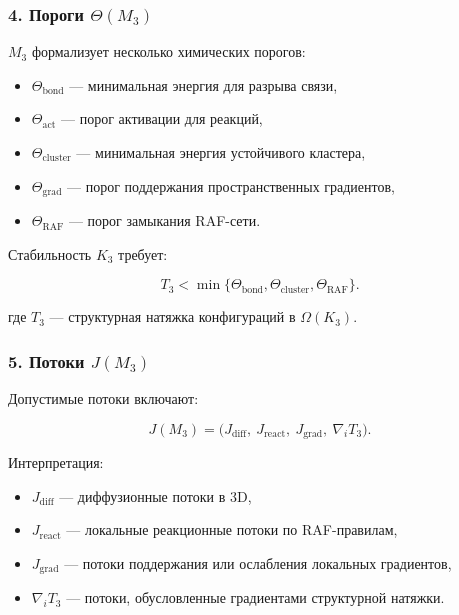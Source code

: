 \subsubsection*{4. Пороги \texorpdfstring{$\Theta(M_3)$}{\Theta(M_3)}}

$M_3$ формализует несколько химических порогов:

\begin{itemize}
    \item $\Theta_{\mathrm{bond}}$ — минимальная энергия для разрыва связи,
    \item $\Theta_{\mathrm{act}}$ — порог активации для реакций,
    \item $\Theta_{\mathrm{cluster}}$ — минимальная энергия устойчивого кластера,
    \item $\Theta_{\mathrm{grad}}$ — порог поддержания пространственных градиентов,
    \item $\Theta_{\mathrm{RAF}}$ — порог замыкания RAF-сети.
\end{itemize}

Стабильность $K_3$ требует:

\[
T_3 < \min\{\Theta_{\mathrm{bond}}, \Theta_{\mathrm{cluster}},
\Theta_{\mathrm{RAF}}\}.
\]

где $T_3$ — структурная натяжка конфигураций в $\Omega(K_3)$.

\subsubsection*{5. Потоки \texorpdfstring{$J(M_3)$}{J(M_3)}}

Допустимые потоки включают:

\[
J(M_3) =
\big(
J_{\mathrm{diff}},\
J_{\mathrm{react}},\
J_{\mathrm{grad}},\
\nabla_i T_3
\big).
\]

Интерпретация:

\begin{itemize}
    \item $J_{\mathrm{diff}}$ — диффузионные потоки в 3D,
    \item $J_{\mathrm{react}}$ — локальные реакционные потоки по RAF-правилам,
    \item $J_{\mathrm{grad}}$ — потоки поддержания или ослабления
    локальных градиентов,
    \item $\nabla_i T_3$ — потоки, обусловленные градиентами структурной натяжки.
\end{itemize}

